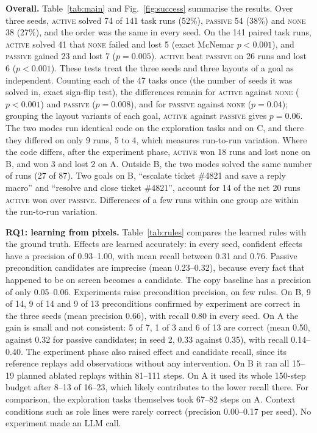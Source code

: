 \documentclass[conference]{IEEEtran}
\newcommand{\modeNone}{\textsc{none}}
\newcommand{\modePassive}{\textsc{passive}}
\newcommand{\modeActive}{\textsc{active}}
\begin{document}
\textbf{Overall.} %
Table~\ref{tab:main} and Fig.~\ref{fig:success} summarise the results. Over three seeds, \modeActive{} solved 74 of 141 task runs (52\%), \modePassive{} 54 (38\%) and \modeNone{} 38 (27\%), and the order was the same in every seed. On the 141 paired task runs, \modeActive{} solved 41 that \modeNone{} failed and lost 5 (exact McNemar $p<0.001$), and \modePassive{} gained 23 and lost 7 ($p=0.005$). \modeActive{} beat \modePassive{} on 26 runs and lost 6 ($p<0.001$). These tests treat the three seeds and three layouts of a goal as independent. Counting each of the 47 tasks once (the number of seeds it was solved in, exact sign-flip test), the differences remain for \modeActive{} against \modeNone{} ($p<0.001$) and \modePassive{} ($p=0.008$), and for \modePassive{} against \modeNone{} ($p=0.04$); grouping the layout variants of each goal, \modeActive{} against \modePassive{} gives $p=0.06$. The two modes run identical code on the exploration tasks and on C, and there they differed on only 9 runs, 5 to 4, which measures run-to-run variation. Where the code differs, after the experiment phase, \modeActive{} won 18 runs and lost none on B, and won 3 and lost 2 on A. Outside B, the two modes solved the same number of runs (27 of 87). Two goals on B, ``escalate ticket \#4821 and save a reply macro'' and ``resolve and close ticket \#4821'', account for 14 of the net 20 runs \modeActive{} won over \modePassive{}. Differences of a few runs within one group are within the run-to-run variation.

\textbf{RQ1: learning from pixels.} %
Table~\ref{tab:rules} compares the learned rules with the ground truth. Effects are learned accurately: in every seed, confident effects have a precision of 0.93--1.00, with mean recall between 0.31 and 0.76. Passive precondition candidates are imprecise (mean 0.23--0.32), because every fact that happened to be on screen becomes a candidate. The copy baseline has a precision of only 0.05--0.06. Experiments raise precondition precision, on few rules. On B, 9 of 14, 9 of 14 and 9 of 13 preconditions confirmed by experiment are correct in the three seeds (mean precision 0.66), with recall 0.80 in every seed. On A the gain is small and not consistent: 5 of 7, 1 of 3 and 6 of 13 are correct (mean 0.50, against 0.32 for passive candidates; in seed 2, 0.33 against 0.35), with recall 0.14--0.40. The experiment phase also raised effect and candidate recall, since its reference replays add observations without any intervention. On B it ran all 15--19 planned ablated replays within 81--111 steps. On A it used its whole 150-step budget after 8--13 of 16--23, which likely contributes to the lower recall there. For comparison, the exploration tasks themselves took 67--82 steps on A. Context conditions such as role lines were rarely correct (precision 0.00--0.17 per seed). No experiment made an LLM call.
\end{document}
